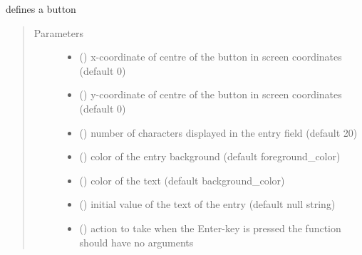 \documentclass[letterpaper,10pt,english]{sphinxmanual}
\begin{document}
\begin{fulllineitems}
\label{\detokenize{Reference:salabim.AnimateEntry}}
defines a button
\begin{quote}\begin{description}
\item[{Parameters}] \leavevmode\begin{itemize}
\item {} 
 () \textendash{} x-coordinate of centre of the button in screen coordinates (default 0)

\item {} 
 () \textendash{} y-coordinate of centre of the button in screen coordinates (default 0)

\item {} 
 () \textendash{} number of characters displayed in the entry field (default 20)

\item {} 
 () \textendash{} color of the entry background (default foreground\_color)

\item {} 
 () \textendash{} color of the text (default background\_color)

\item {} 
 () \textendash{} initial value of the text of the entry (default null string) 

\item {} 
 () \textendash{} action to take when the Enter-key is pressed 
the function should have no arguments 


\end{itemize}
\end{description}
\end{quote}
\end{fulllineitems}
\end{document}
